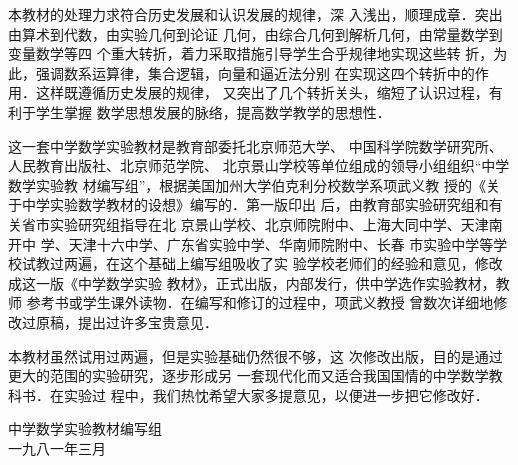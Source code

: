     本教材的处理力求符合历史发展和认识发展的规律，深
入浅出，顺理成章．突出由算术到代数，由实验几何到论证
几何，由综合几何到解析几何，由常量数学到变量数学等四
个重大转折，着力采取措施引导学生合乎规律地实现这些转
折，为此，强调数系运算律，集合逻辑，向量和逼近法分别
在实现这四个转折中的作用．这样既遵循历史发展的规律，
又突出了几个转折关头，缩短了认识过程，有利于学生掌握
数学思想发展的脉络，提高数学教学的思想性．

这一套中学数学实验教材是教育部委托北京师范大学、
中国科学院数学研究所、人民教育出版社、北京师范学院、
北京景山学校等单位组成的领导小组组织“中学数学实验教
材编写组”，根据美国加州大学伯克利分校数学系项武义教
授的《关于中学实验数学教材的设想》编写的．第一版印出
后，由教育部实验研究组和有关省市实验研究组指导在北
京景山学校、北京师院附中、上海大同中学、天津南开中
学、天津十六中学、广东省实验中学、华南师院附中、长春
市实验中学等学校试教过两遍，在这个基础上编写组吸收了实
验学校老师们的经验和意见，修改成这一版《中学数学实验
教材》，正式出版，内部发行，供中学选作实验教材，教师
参考书或学生课外读物．在编写和修订的过程中，项武义教授
曾数次详细地修改过原稿，提出过许多宝贵意见．

    本教材虽然试用过两遍，但是实验基础仍然很不够，这
次修改出版，目的是通过更大的范围的实验研究，逐步形成另
一套现代化而又适合我国国情的中学数学教科书．在实验过
程中，我们热忱希望大家多提意见，以便进一步把它修改好．

\begin{flushright}
    中学数学实验教材编写组\\
    一九八一年三月
\end{flushright}







